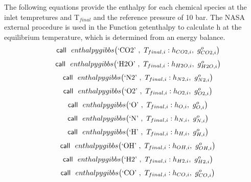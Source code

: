 \documentclass[10pt,fleqn]{article}
\newcommand{\F}[1]{\mbox{$#1$}}
\newcommand{\K}[1]{\mbox{\sf#1\ \ \mit}}
\newcommand{\SC}[1]{\mbox{`#1'}\  }
\newcommand{\I}{\mbox{\hspace{0.20in}}}
\begin{document}
\vspace{0.04in}
\noindent
\rm The following equations provide the enthalpy for each chemical species at the inlet tempretures and T$_{final}$ and the reference pressure of 10 bar. The NASA external procedure is used in 	the Function getenthalpy to calculate h at the equilibrium temperature, which is determined from an energy balance.
\begin{equation}
\I \label{EES Eqn:37}
\K{call} \F{enthalpygibbs}{ \left( \SC{CO2},\ T_{final,i} : h_{CO2,i} ,\ g^{o}_{CO2,i} \right) } 
\end{equation}
\begin{equation}
\I \label{EES Eqn:38}
\K{call} \F{enthalpygibbs}{ \left( \SC{H2O},\ T_{final,i} : h_{H2O,i} ,\ g^{o}_{H2O,i} \right) } 
\end{equation}
\begin{equation}
\I \label{EES Eqn:39}
\K{call} \F{enthalpygibbs}{ \left( \SC{N2},\ T_{final,i} : h_{N2,i} ,\ g^{o}_{N2,i} \right) } 
\end{equation}
\begin{equation}
\I \label{EES Eqn:40}
\K{call} \F{enthalpygibbs}{ \left( \SC{O2},\ T_{final,i} : h_{O2,i} ,\ g^{o}_{O2,i} \right) } 
\end{equation}
\begin{equation}
\I \label{EES Eqn:41}
\K{call} \F{enthalpygibbs}{ \left( \SC{O},\ T_{final,i} : h_{O,i} ,\ g^{o}_{O,i} \right) } 
\end{equation}
\begin{equation}
\I \label{EES Eqn:42}
\K{call} \F{enthalpygibbs}{ \left( \SC{N},\ T_{final,i} : h_{N,i} ,\ g^{o}_{N,i} \right) } 
\end{equation}
\begin{equation}
\I \label{EES Eqn:43}
\K{call} \F{enthalpygibbs}{ \left( \SC{H},\ T_{final,i} : h_{H,i} ,\ g^{o}_{H,i} \right) } 
\end{equation}
\begin{equation}
\I \label{EES Eqn:44}
\K{call} \F{enthalpygibbs}{ \left( \SC{OH},\ T_{final,i} : h_{OH,i} ,\ g^{o}_{OH,i} \right) } 
\end{equation}
\begin{equation}
\I \label{EES Eqn:45}
\K{call} \F{enthalpygibbs}{ \left( \SC{H2},\ T_{final,i} : h_{H2,i} ,\ g^{o}_{H2,i} \right) } 
\end{equation}
\begin{equation}
\I \label{EES Eqn:46}
\K{call} \F{enthalpygibbs}{ \left( \SC{CO},\ T_{final,i} : h_{CO,i} ,\ g^{o}_{CO,i} \right) } 
\end{equation}
\end{document}
